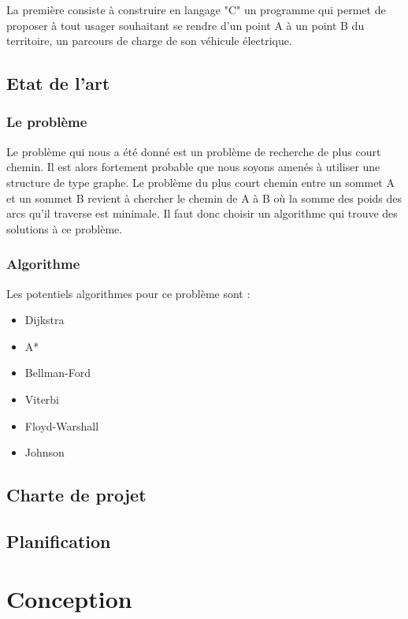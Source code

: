\documentclass[a4paper, 12pt]{report}
\begin{document}
La première consiste à construire en langage "C" un programme qui permet de proposer à tout usager souhaitant se rendre d'un point A à un point B du territoire, un parcours de charge de son véhicule électrique.

\subsection{Etat de l'art}
\subsubsection{Le problème}
Le problème qui nous a été donné est un problème de recherche de plus court chemin. Il est alors fortement probable que nous soyons amenés à utiliser une structure de type graphe. Le problème du plus court chemin entre un sommet A et un sommet B revient à chercher le chemin de A à B où la somme des poids des arcs qu’il traverse est minimale\footnotemark[1]. Il faut donc choisir un algorithme qui trouve des solutions à ce problème.

\subsubsection{Algorithme}
Les potentiels algorithmes pour ce problème sont :
\begin{itemize}
    \item Dijkstra
    \item A*
    \item Bellman-Ford
    \item Viterbi
    \item Floyd-Warshall
    \item Johnson
\end{itemize}



\subsection{Charte de projet}

\subsection{Planification}
\clearpage

\section{Conception}
\end{document}
